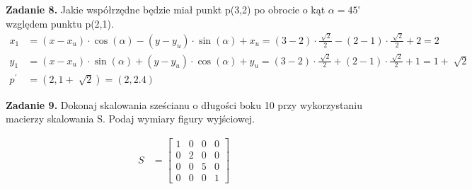 \documentclass[a4paper]{article}
\begin{document}

\noindent\textbf{Zadanie 8.}
\noindent\textnormal{Jakie współrzędne będzie miał punkt p(3,2) po obrocie o kąt $\alpha=45^{\circ}$ względem
punktu p(2,1).}
\begin{align*}
x_1 &= (x-x_u) \cdot \cos (\alpha) - (y-y_u) \cdot \sin (\alpha)+x_u = (3 - 2) \cdot \frac{\sqrt[]{2}}{2}
- ( 2 - 1 ) \cdot \frac{\sqrt[]{2}}{2} + 2 = 2 \\
y_1 &= (x-x_u) \cdot \sin (\alpha) + (y-y_u) \cdot \cos (\alpha)+y_u = (3 - 2) \cdot \frac{\sqrt[]{2}}{2}
+ ( 2 - 1 ) \cdot \frac{\sqrt[]{2}}{2} + 1 = 1 + \sqrt[]{2} \\
p^{\prime} &= ( 2 , 1 + \sqrt[]{2}) = (2 , 2.4)
\end{align*}

\noindent\textbf{Zadanie 9.}
\noindent\textnormal{Dokonaj skalowania sześcianu o długości boku 10 przy wykorzystaniu macierzy
skalowania S. Podaj wymiary figury wyjściowej.}

\begin{align*}
S &= 
\left[
\begin{matrix}
1 & 0 & 0 & 0\\
0 & 2 & 0 & 0\\
0 & 0 & 5 & 0\\
0 & 0 & 0 & 1
\end{matrix}
\right]
\end{align*}
\end{document}

